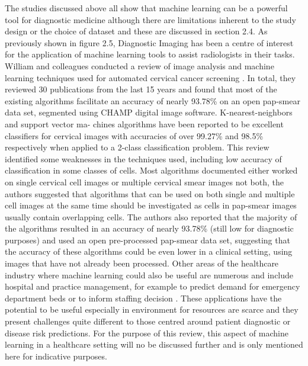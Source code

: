  The studies discussed above all show that machine learning can be a powerful tool for diagnostic medicine although there are limitations inherent to the study design or the choice of dataset and these are discussed in section 2.4.\newline
 As previously shown in figure 2.5, Diagnostic Imaging has been a centre of interest for the application of machine learning tools to assist radiologists in their tasks. William and colleagues conducted a review of image analysis and machine learning techniques used for automated cervical cancer screening \citep{William:2018ia}. In total, they reviewed 30 publications from the last 15 years and found that most of the existing algorithms facilitate an accuracy of nearly 93.78\% on an open pap-smear data set, segmented using CHAMP digital image software. K-nearest-neighbors and support vector ma- chines algorithms have been reported to be excellent classifiers for cervical images with accuracies of over 99.27\% and 98.5\% respectively when applied to a 2-class classification problem. \newline 
 This review identified some weaknesses in the techniques used, including low accuracy of classification in some classes of cells. Most algorithms documented either worked on single cervical cell images or multiple cervical smear images not both, the authors suggested that algorithms that can be used on both single and multiple cell images at the same time should be investigated as cells in pap-smear images usually contain overlapping cells.\newline
 The authors also reported that the majority of the algorithms resulted in an accuracy of nearly 93.78\% (still low for diagnostic purposes) and used an open pre-processed pap-smear data set, suggesting that the accuracy of these algorithms could be even lower in a clinical setting, using images that have not already been processed.\newline 
Other areas of the healthcare industry where machine learning could also be useful are numerous and include hospital and practice management, for example to predict demand for emergency department beds or to inform staffing decision \citep{Callahan:2017bz, Tiwari:2014bq}. These applications have the potential to be useful especially in environment for resources are scarce and they present challenges quite different to those centred around patient diagnostic or disease risk predictions. For the purpose of this review, this aspect of machine learning in a healthcare setting will no be discussed further and is only mentioned here for indicative purposes.


